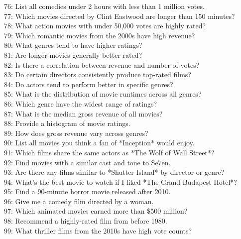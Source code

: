\documentclass[
a4paper,
12pt,
]{article}
\begin{document}
\begin{appendices}
76: List all comedies under 2 hours with less than 1 million votes.\\
77: Which movies directed by Clint Eastwood are longer than 150 minutes?\\
78: What action movies with under 50,000 votes are highly rated?\\
79: Which romantic movies from the 2000s have high revenue?\\
80: What genres tend to have higher ratings?\\
81: Are longer movies generally better rated?\\
82: Is there a correlation between revenue and number of votes?\\
83: Do certain directors consistently produce top-rated films?\\
84: Do actors tend to perform better in specific genres?\\
85: What is the distribution of movie runtimes across all genres?\\
86: Which genre have the widest range of ratings?\\
87: What is the median gross revenue of all movies?\\
88: Provide a histogram of movie ratings.\\
89: How does gross revenue vary across genres?\\
90: List all movies you think a fan of *Inception* would enjoy.\\
91: Which films share the same actors as *The Wolf of Wall Street*?\\
92: Find movies with a similar cast and tone to Se7en.\\
93: Are there any films similar to *Shutter Island* by director or genre?\\
94: What’s the best movie to watch if I liked *The Grand Budapest Hotel*?\\
95: Find a 90-minute horror movie released after 2010.\\
96: Give me a comedy film directed by a woman.\\
97: Which animated movies earned more than \$500 million?\\
98: Recommend a highly-rated film from before 1980.\\
99: What thriller films from the 2010s have high vote counts?


\end{appendices}
\end{document}
